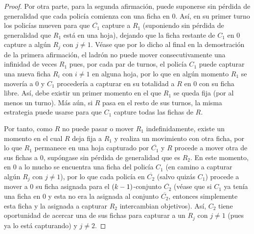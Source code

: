 \begin{proof}
    Por otra parte, para la segunda afirmaci\'on, puede suponerse sin p\'erdida
    de generalidad que cada polic\'ia comienza con una ficha en $0$. As\'i, en
    su primer turno los polic\'ias mueven para que $\overline{C_1}$ capture a
    $R_1$ (suponiendo sin p\'erdida de generalidad que $R_1$ est\'a en una
    hoja), dejando que la ficha restante de $C_1$ en $0$ capture a alg\'un $R_j$
    con $j\neq 1$. V\'ease que por lo dicho al final en la demostraci\'on de la
    primera afirmaci\'on, el ladr\'on no puede mover consecutivamente una
    infinidad de veces $R_1$ pues, por cada par de turnos, el polic\'ia $C_1$
    puede capturar una nueva ficha $R_i$ con $i\neq 1$ en alguna hoja, por lo
    que en alg\'un momento $R_1$ se mover\'ia a $0$ y $C_1$ proceder\'ia a
    capturar en su totalidad a $R$ en $0$ con su ficha libre. As\'i, debe
    existir un primer momento en el que $R_1$ se queda fija (por al menos un
    turno). M\'as a\'un, si $R$ pasa en el resto de sus turnos, la misma
    estrategia puede usarse para que $C_1$ capture todas las fichas de $R$.

    Por tanto, como $R$ no puede pasar o mover $R_1$ indefinidamente, existe un
    momento en el cual $R$ deja fija a $R_1$ y realiza un movimiento con otra
    ficha, por lo que $R_1$ permanece en una hoja capturado por $\overline{C_1}$
    y $R$ procede a mover otra de sus fichas a $0$, sup\'ongase sin p\'erdida de
    generalidad que es $R_2$. En este momento, en $0$ a lo mucho se encuentra
    una ficha del polic\'ia $C_1$ (en camino a capturar alg\'un $R_j$ con $j\neq
    1$), por lo que cada polic\'ia en $\overline{C_2}$ (salvo quiz\'as $C_1$)
    procede a mover a $0$ su ficha asignada para el $\left( k-1\right)$-conjunto
    $\overline{C_2}$ (v\'ease que si $C_1$ ya ten\'ia una ficha en $0$ y esta no
    era la asignada al conjunto $\overline{C_2}$, entonces simplemente esta
    ficha y la asignada a capturar $R_2$ intercambian objetivos). As\'i, $C_2$
    tiene oportunidad de acercar una de sus fichas para capturar a un $R_j$ con
    $j\neq 1$ (pues ya lo est\'a capturando) y $j\neq 2$.


\end{proof}

